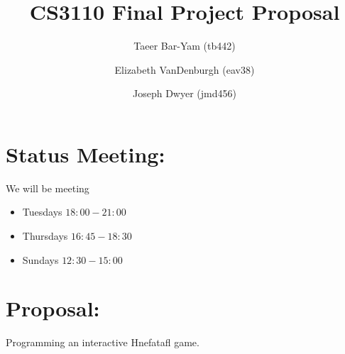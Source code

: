 \documentclass[11pt, oneside]{article}
\title{CS3110 Final Project Proposal}
\author{Taeer Bar-Yam (tb442) \and Elizabeth VanDenburgh (eav38) \and Joseph
  Dwyer (jmd456)}
\begin{document}
\maketitle

\section{Status Meeting:}
We will be meeting
\begin{itemize}
\item Tuesdays $18:00-21:00$
\item Thursdays $16:45-18:30$
\item Sundays $12:30-15:00$
\end{itemize}

\section{Proposal:}
Programming an interactive Hnefatafl game.
\end{document}
